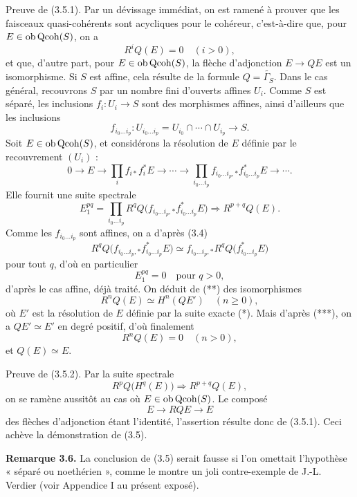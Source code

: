 \documentclass[11pt]{article}
\begin{document}
Preuve de (3.5.1). Par un dévissage immédiat, on est ramené à prouver que les faisceaux quasi-cohérents sont acycliques pour le cohéreur, c'est-à-dire que, pour $E\in\operatorname{ob}\operatorname{Qcoh}(S)$, on a
\[
R^iQ(E)=0\quad (i>0),
\]
et que, d'autre part, pour $E\in\operatorname{ob}\operatorname{Qcoh}(S)$, la flèche d'adjonction $E\to QE$ est un isomorphisme. Si $S$ est affine, cela résulte de la formule $Q=\widetilde{\Gamma_S}$. Dans le cas général, recouvrons $S$ par un nombre fini d'ouverts affines $U_i$. Comme $S$ est séparé, les inclusions $f_i:U_i\to S$ sont des morphismes affines, ainsi d'ailleurs que les inclusions
\[
f_{i_0\ldots i_p}:U_{i_0\ldots i_p}=U_{i_0}\cap\cdots\cap U_{i_p}\to S.
\]
Soit $E\in\operatorname{ob}\operatorname{Qcoh}(S)$, et considérons la résolution de $E$ définie par le recouvrement $(U_i)$ :
\begin{equation}\tag{*}
0\longrightarrow E\longrightarrow \prod_i f_{i*}f_i^*E\longrightarrow\cdots\longrightarrow
\prod_{i_0\ldots i_p} f_{i_0\ldots i_p,*}f_{i_0\ldots i_p}^*E\longrightarrow\cdots.
\end{equation}
Elle fournit une suite spectrale
\begin{equation}\tag{**}
E_1^{pq}=\prod_{i_0\ldots i_p} R^qQ\bigl(f_{i_0\ldots i_p,*}f_{i_0\ldots i_p}^*E\bigr)
\Longrightarrow R^{p+q}Q(E).
\end{equation}
Comme les $f_{i_0\ldots i_p}$ sont affines, on a d'après (3.4)
\begin{equation}\tag{***}
R^qQ\bigl(f_{i_0\ldots i_p,*}f_{i_0\ldots i_p}^*E\bigr)
\simeq
f_{i_0\ldots i_p,*} R^qQ\bigl(f_{i_0\ldots i_p}^*E\bigr)
\end{equation}
pour tout $q$, d'où en particulier
\[
E_1^{pq}=0\quad\text{pour }q>0,
\]
d'après le cas affine, déjà traité. On déduit de (**) des isomorphismes
\[
R^nQ(E)\simeq H^n(QE')\quad(n\geq0),
\]
où $E'$ est la résolution de $E$ définie par la suite exacte (*). Mais d'après (***), on a $QE'\simeq E'$ en degré positif, d'où finalement
\[
R^nQ(E)=0\quad(n>0),
\]
et $Q(E)\simeq E$.

Preuve de (3.5.2). Par la suite spectrale
\[
R^pQ\bigl(H^q(E)\bigr)\Longrightarrow R^{p+q}Q(E),
\]
on se ramène aussitôt au cas où $E\in\operatorname{ob}\operatorname{Qcoh}(S)$. Le composé
\[
E\longrightarrow RQE\longrightarrow E
\]
des flèches d'adjonction étant l'identité, l'assertion résulte donc de (3.5.1). Ceci achève la démonstration de (3.5).

\textbf{Remarque 3.6.} La conclusion de (3.5) serait fausse si l'on omettait l'hypothèse « séparé ou noethérien », comme le montre un joli contre-exemple de J.-L. Verdier (voir Appendice I au présent exposé).
\end{document}
